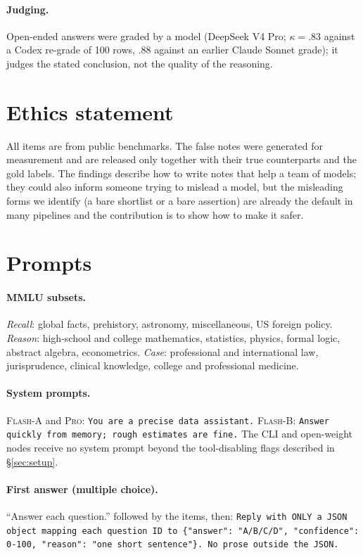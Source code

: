\documentclass[11pt]{article}
\begin{document}
\paragraph{Judging.} Open-ended answers were graded by a model (DeepSeek V4 Pro; $\kappa=.83$ against a Codex re-grade of 100 rows, $.88$ against an earlier Claude Sonnet grade); it judges the stated conclusion, not the quality of the reasoning.

\section*{Ethics statement}
All items are from public benchmarks. The false notes were generated for measurement and are released only together with their true counterparts and the gold labels. The findings describe how to write notes that help a team of models; they could also inform someone trying to mislead a model, but the misleading forms we identify (a bare shortlist or a bare assertion) are already the default in many pipelines and the contribution is to show how to make it safer.



\appendix

\section{Prompts}
\label{app:prompts}

\paragraph{MMLU subsets.} \emph{Recall}: global facts, prehistory, astronomy, miscellaneous, US foreign policy. \emph{Reason}: high-school and college mathematics, statistics, physics, formal logic, abstract algebra, econometrics. \emph{Case}: professional and international law, jurisprudence, clinical knowledge, college and professional medicine.

\paragraph{System prompts.} \textsc{Flash-A} and \textsc{Pro}: \texttt{You are a precise data assistant.} \textsc{Flash-B}: \texttt{Answer quickly from memory; rough estimates are fine.} The CLI and open-weight nodes receive no system prompt beyond the tool-disabling flags described in \S\ref{sec:setup}.

\paragraph{First answer (multiple choice).} ``Answer each question.'' followed by the items, then: \texttt{Reply with ONLY a JSON object mapping each question ID to \{"answer": "A/B/C/D", "confidence": 0-100, "reason": "one short sentence"\}. No prose outside the JSON.}
\end{document}
